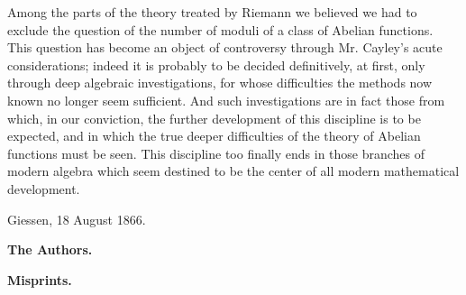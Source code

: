 \documentclass[10pt]{article}
\begin{document}
Among the parts of the theory treated by Riemann we believed we had to exclude the question of the number of moduli of a class of Abelian functions. This question has become an object of controversy through Mr. Cayley's acute considerations; indeed it is probably to be decided definitively, at first, only through deep algebraic investigations, for whose difficulties the methods now known no longer seem sufficient. And such investigations are in fact those from which, in our conviction, the further development of this discipline is to be expected, and in which the true deeper difficulties of the theory of Abelian functions must be seen. This discipline too finally ends in those branches of modern algebra which seem destined to be the center of all modern mathematical development.

\vspace{0.6em}
\noindent Giessen, 18 August 1866.

\begin{flushright}
{\bfseries The Authors.}
\end{flushright}

\vspace{1.0em}

\begin{center}
{\Large\bfseries Misprints.}
\end{center}
\end{document}
